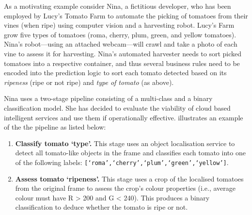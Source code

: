As a motivating example consider Nina, a fictitious developer, who has been employed by Lucy's Tomato Farm to automate the picking of tomatoes from their vines (when ripe) using computer vision and a harvesting robot. Lucy's Farm grow five types of tomatoes (roma, cherry, plum, green, and yellow tomatoes). Nina's robot---using an attached webcam---will crawl and take a photo of each vine to assess it for harvesting.
Nina's automated harvester needs to sort picked tomatoes into a respective container, and thus several business rules need to be encoded into the prediction logic to sort each tomato detected based on its \textit{ripeness} (ripe or not ripe) and \textit{type of tomato} (as above).

Nina uses a two-stage pipeline consisting of a multi-class and a binary classification model. She has decided to evaluate the viability of cloud based intelligent services and use them if operationally effective.
 illustrates an example of the the pipeline as listed below:

 \begin{enumerate}
    \item \textbf{Classify tomato `type'.} This stage uses an object localisation service to detect all tomato-like objects in the frame and classifies each tomato into one of the following labels: \texttt{[`roma',`cherry',`plum',`green',`yellow']}.
    \item \textbf{Assess tomato `ripeness'.} This stage uses a crop of the localised tomatoes from the original frame to assess the crop's colour properties (i.e., average colour must have R > 200 and G < 240). This produces a binary classification to deduce whether the tomato is ripe or not.
\end{enumerate}

